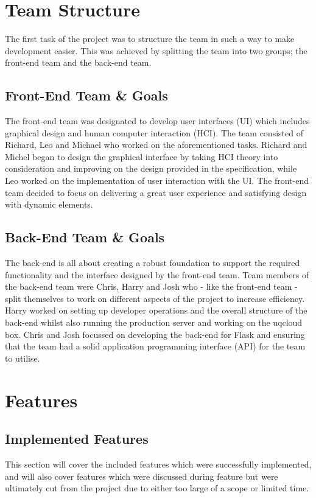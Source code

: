 \documentclass{article}
\begin{document}
\section{Team Structure}
	
	The first task of the project was to structure the team in such a way to make development easier. This was achieved by splitting the team into two groups; the front-end team and the back-end team. 
	
	\subsection{Front-End Team \& Goals}
		The front-end team was designated to develop user interfaces (UI) which includes graphical design and human computer interaction (HCI). The team consisted of Richard, Leo and Michael who worked on the aforementioned tasks. Richard and Michel began to design the graphical interface by taking HCI theory into consideration and improving on the design provided in the specification, while Leo worked on the implementation of user interaction with the UI. The front-end team decided to focus on delivering a great user experience and satisfying design with dynamic elements. 

	\subsection{Back-End Team \& Goals}
		The back-end is all about creating a robust foundation to support the required functionality and the interface designed by the front-end team. Team members of the back-end team were Chris, Harry and Josh who - like the front-end team - split themselves to work on different aspects of the project to increase efficiency. Harry worked on setting up developer operations and the overall structure of the back-end whilst also running the production server and working on the uqcloud box. Chris and Josh focussed on developing the back-end for Flask and ensuring that the team had a solid application programming interface (API) for the team to utilise.

\section{Features}
	
	\subsection{Implemented Features}
		This section will cover the included features which were successfully implemented, and will also cover features which were discussed during feature  but were ultimately cut from the project due to either too large of a scope or limited time.
\end{document}

